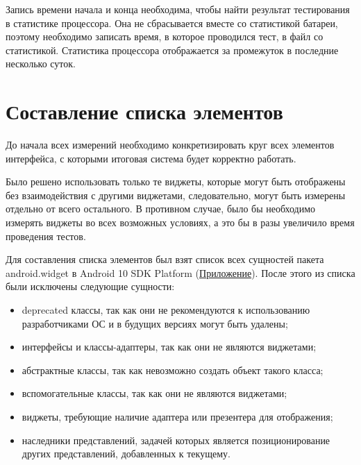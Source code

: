 \documentclass[a4paper,14pt]{extarticle} %
\begin{document}
	Запись времени начала и конца необходима, чтобы найти результат тестирования в статистике процессора. Она не сбрасывается вместе со статистикой батареи, поэтому необходимо записать время, в которое проводился тест, в файл со статистикой. Статистика процессора отображается за промежуток в последние несколько суток.
	
	\clearpage
	\section{Составление списка элементов}
	
	До начала всех измерений необходимо конкретизировать круг всех элементов интерфейса, с которыми итоговая система будет корректно работать.
	
	Было решено использовать только те виджеты, которые могут быть отображены без взаимодействия с другими виджетами, следовательно, могут быть измерены отдельно от всего остального. В противном случае, было бы необходимо измерять виджеты во всех возможных условиях, а это бы в разы увеличило время проведения тестов.
	
	Для составления списка элементов был взят список всех сущностей пакета android.widget в Android 10 SDK Platform (\hyperref[appendix]{Приложение}). После этого из списка были исключены следующие сущности:
	\begin{itemize}
		\item deprecated классы, так как они не рекомендуются к использованию разработчиками ОС и в будущих версиях могут быть удалены;
		\item интерфейсы и классы-адаптеры, так как они не являются виджетами;
		\item абстрактные классы, так как невозможно создать объект такого класса;
		\item вспомогательные классы, так как они не являются виджетами;
		\item виджеты, требующие наличие адаптера или презентера для отображения;
		\item наследники представлений, задачей которых является позиционирование других представлений, добавленных к текущему.
	\end{itemize}
	
\end{document}
